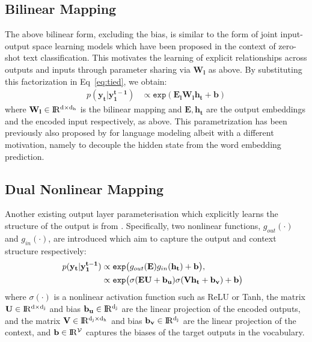 \documentclass{article}
\begin{document}
\subsection{Bilinear Mapping}  
The above bilinear form, excluding the bias, is similar to the form of joint input-output space learning models \cite{yazhen15,nam16} which have been proposed in the context of zero-shot text classification. This motivates the learning of explicit relationships across outputs and inputs through parameter sharing via $\mathbf{W_l}$ as above. By substituting this factorization in Eq~\ref{eq:tied}, we obtain: 
\begin{align}
 p(\mathbf{y_t}|{\mathbf{y_1^{t-1}}}) 
          & \propto  \texttt{exp}(\mathbf{E_{l}}\mathbf{\mathbf{W_l}}\mathbf{{h}_t} + \mathbf{b})   \label{eq:bilinear_soft}
\end{align} 
where $\mathbf{W_l} \in \rm I\!R^{d \times d_h}$ is the bilinear mapping and $\mathbf{E}, \mathbf{h_t}$ are the output embeddings and the encoded input respectively, as above. This parametrization has been previously also proposed by \citet{gulordava18} for language modeling albeit with a different motivation, namely to decouple the hidden state from the word embedding prediction.

\subsection{Dual Nonlinear Mapping} \label{joint} Another existing output layer parameterisation which explicitly learns the structure of the output is from \cite{pappas18}. Specifically, two nonlinear functions, $g_{out}(\cdot)$ and $g_{in}(\cdot)$, are introduced which aim to capture the output and context structure respectively: 
\begin{align}
\hspace{-3mm}p(\mathbf{y_t}|\mathbf{y_1^{t-1}}) & \propto  \texttt{exp}\big(    g_{out}(\mathbf{E}) g_{in}(\mathbf{h_t}) + \mathbf{b} \big), 
 \label{general_joint_form}
 \\
 & \propto  \texttt{exp}\big( \sigma(\mathbf{EU} + \mathbf{b_{u}}) \sigma( \mathbf{V h_t} + \mathbf{b_{v}}) + \mathbf{b} \big)
 \label{joint_form}
\end{align}
\noindent where $\sigma(\cdot)$ is a nonlinear activation function such as ReLU or Tanh, the matrix $\mathbf{U} \in \rm I\!R^{d \times d_j}$ and bias $\mathbf{b_{u}} \in \rm I\!R^{d_j}$ are the linear projection of the encoded outputs, and the matrix $\mathbf{V} \in \rm I\!R^{ d_j \times  d_h}$ and bias $\mathbf{b_{v}} \in \rm I\!R^{d_j}$ are the linear projection of the context, and $\mathbf{b} \in \rm I\!R^{\mathcal{V}}$ captures the biases of the target outputs in the vocabulary.
\end{document}
